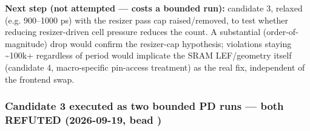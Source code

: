 \begin{record}
\textbf{Next step (not attempted --- costs a bounded run):} candidate 3,
relaxed  (e.g. 900--1000 ps) with the resizer pass
cap raised/\allowbreak{}removed, to test whether reducing resizer-driven
cell pressure reduces the  count. A substantial
(order-of-magnitude) drop would confirm the resizer-cap hypothesis;
violations staying \textasciitilde100k+ regardless of period would
implicate the SRAM LEF/\allowbreak{}geometry itself (candidate 4,
macro-specific pin-access treatment) as the real fix, independent of the
frontend swap.

\end{record}

\subsubsection{\texorpdfstring{Candidate 3 executed as two bounded PD
runs --- both REFUTED (2026-09-19, bead
)}{Candidate 3 executed as two bounded PD runs --- both REFUTED (2026-09-19, bead )}}\label{cr:run:asap7:candidate-3-executed-as-two-bounded-pd-runs-both-refuted-2026-09-19-bead-lxv}


